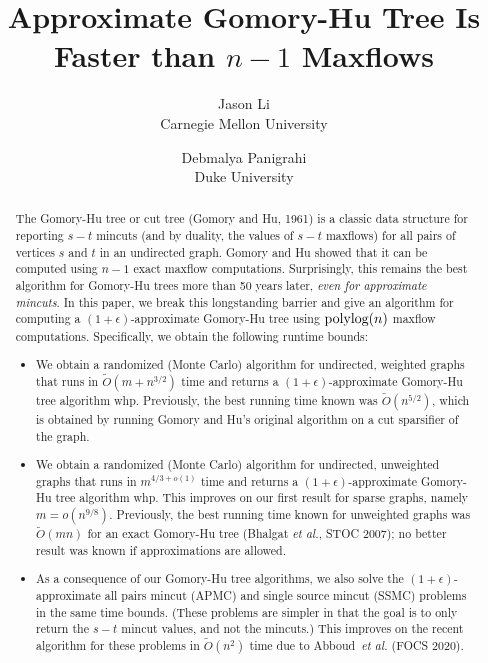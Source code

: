 \documentclass[11pt]{article}
\title{Approximate Gomory-Hu Tree Is Faster than $n-1$ Maxflows}
\author{{Jason Li\\Carnegie Mellon University} \and {Debmalya Panigrahi\\Duke University}}
\date{}
\newcommand{\e}{\epsilon}
\newcommand{\1}{\mathbbm 1}
\newcommand{\polylog}{\textup{polylog}}
\newcommand{\tO}{\tilde{O}}
\newcommand{\ssc}{{\sc SSMC}\xspace}
\newcommand{\apc}{{\sc APMC}\xspace}
\begin{document}
\maketitle

\begin{abstract}
    The Gomory-Hu tree or cut tree (Gomory and Hu, 1961) is a classic data structure for reporting $s-t$ mincuts (and by duality, the values of $s-t$ maxflows) for all pairs of vertices $s$ and $t$ in an undirected graph. Gomory and Hu showed that it can be computed using $n-1$ exact maxflow computations. Surprisingly, this remains the best algorithm for Gomory-Hu trees more than 50 years later, {\em even for approximate mincuts}. In this paper, we break this longstanding barrier and give an algorithm for computing a $(1+\e)$-approximate Gomory-Hu tree using $\polylog(n)$ maxflow computations. Specifically, we obtain the following runtime bounds:
    \begin{itemize}
        \item We obtain a randomized (Monte Carlo) algorithm for undirected, weighted graphs that runs in $\tO(m + n^{3/2})$ time and returns a $(1+\e)$-approximate Gomory-Hu tree algorithm whp. Previously, the best running time known was $\tO(n^{5/2})$, which is obtained by running Gomory and Hu's original algorithm on a cut sparsifier of the graph.
        \item We obtain a randomized (Monte Carlo) algorithm for undirected, unweighted graphs that runs in $m^{4/3+o(1)}$ time and returns a $(1+\e)$-approximate Gomory-Hu tree algorithm whp. This improves on our first result for sparse graphs, namely $m = o(n^{9/8})$. Previously, the best running time known for unweighted graphs was $\tO(mn)$ for an exact Gomory-Hu tree (Bhalgat {\em et al.}, STOC 2007); no better result was known if approximations are allowed.
        \item As a consequence of our Gomory-Hu tree algorithms, we also solve the $(1+\e)$-approximate all pairs mincut (\apc) and single source mincut (\ssc) problems in the same time bounds. (These problems are simpler in that the goal is to only return the $s-t$ mincut values, and not the mincuts.) This improves on the recent algorithm for these problems in $\tO(n^2)$ time due to Abboud~{\em et al.} (FOCS 2020).
    \end{itemize}
\end{abstract}


\clearpage
\end{document}
